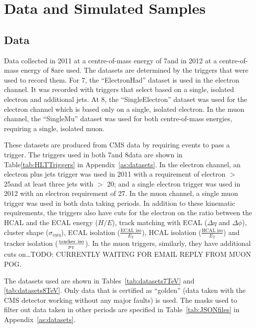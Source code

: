 \section{Data and Simulated Samples}
\label{s:data_and_simulated_samples}

\subsection{Data}
\label{ss:data}

Data collected in 2011 at a centre-of-mass energy of 7\TeV and in 2012 at a centre-of-mass energy of 8\TeV are
used. The datasets are determined by the triggers that were used to record them. For 7\TeV, the ``ElectronHad''
dataset is used in the electron channel. It was recorded with triggers that select based on a single, isolated
electron and additional jets. At 8\TeV, the ``SingleElectron'' dataset was used for the electron channel which is
based only on a single, isolated electron. In the muon channel, the ``SingleMu'' dataset was used for both
centre-of-mass energies, requiring a single, isolated muon.

These datasets are produced from CMS data by requiring events to pass a trigger. The triggers used in both
7\TeV and 8\TeV data are shown in Table\ref{tab:HLTTriggers} in Appendix~\ref{as:datasets}. In the electron
channel, an electron plus jets trigger was used in 2011 with a requirement of electron \Et $>$ 25\GeV and at least three jets with \pt
$>$ 20\GeV; and a single electron trigger was used in 2012 with an electron \Et requirement of 27\GeV. In the
muon channel, a single muon trigger was used in both data taking periods. In addition to these kinematic
requirements, the triggers also have cuts for the electron on the ratio between the HCAL and the ECAL energy
($H/E$), track matching with ECAL ($\Delta\eta$ and $\Delta\phi$), cluster shape ($\sigma_{i\eta i\eta}$),
ECAL isolation ($\frac{\text{ECAL iso}}{E_\text{T}}$), HCAL isolation ($\frac{\text{HCAL iso}}{E_\text{T}}$)
and tracker isolation ($\frac{\text{tracker iso}}{p_{\mathrm{T}}}$). In the muon triggers, similarly, they have
additional cuts on\ldots TODO: CURRENTLY WAITING FOR EMAIL REPLY FROM MUON POG.

The datasets used are shown in Tables~\ref{tab:datasets7TeV} and \ref{tab:datasets8TeV}. %
Only data that is certified as ``golden'' (data taken with the CMS detector
working without any major faults) is used. The masks used to filter out data taken in other periods are
specified in Table~\ref{tab:JSONfiles} in Appendix~\ref{as:datasets}.

